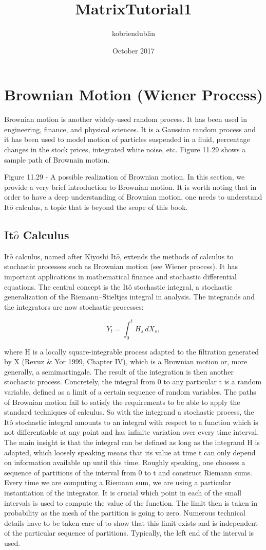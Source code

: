\documentclass{article}
\title{MatrixTutorial1}
\author{kobriendublin }
\date{October 2017}
\begin{document}
\section{Brownian Motion (Wiener Process)}

Brownian motion is another widely-used random process. It has been used in engineering, finance, and physical sciences. It is a Gaussian random process and it has been used to model motion of particles suspended in a fluid, percentage changes in the stock prices, integrated white noise, etc. Figure 11.29 shows a sample path of Brownain motion. 


Figure 11.29 - A possible realization of Brownian motion.
In this section, we provide a very brief introduction to Brownian motion. It is worth noting that in order to have a deep understanding of Brownian motion, one needs to understand It$\hat{o}$ calculus, a topic that is beyond the scope of this book.

\subsection*{It$\hat{o}$ Calculus}
It$\hat{o}$ calculus, named after Kiyoshi It$\hat{o}$, extends the methods of calculus to stochastic processes such as Brownian motion (see Wiener process). It has important applications in mathematical finance and stochastic differential equations. 
The central concept is the Itô stochastic integral, a stochastic generalization of the Riemann–Stieltjes integral in analysis. The integrands and the integrators are now stochastic processes:

\[{\displaystyle Y_{t}=\int _{0}^{t}H_{s}\,dX_{s},} \]

where H is a locally square-integrable process adapted to the filtration generated by X (Revuz & Yor 1999, Chapter IV), which is a Brownian motion or, more generally, a semimartingale. The result of the integration is then another stochastic process. Concretely, the integral from 0 to any particular t is a random variable, defined as a limit of a certain sequence of random variables. The paths of Brownian motion fail to satisfy the requirements to be able to apply the standard techniques of calculus. So with the integrand a stochastic process, the Itô stochastic integral amounts to an integral with respect to a function which is not differentiable at any point and has infinite variation over every time interval. The main insight is that the integral can be defined as long as the integrand H is adapted, which loosely speaking means that its value at time t can only depend on information available up until this time. Roughly speaking, one chooses a sequence of partitions of the interval from 0 to t and construct Riemann sums. Every time we are computing a Riemann sum, we are using a particular instantiation of the integrator. It is crucial which point in each of the small intervals is used to compute the value of the function. The limit then is taken in probability as the mesh of the partition is going to zero. Numerous technical details have to be taken care of to show that this limit exists and is independent of the particular sequence of partitions. Typically, the left end of the interval is used. 

\end{document}

